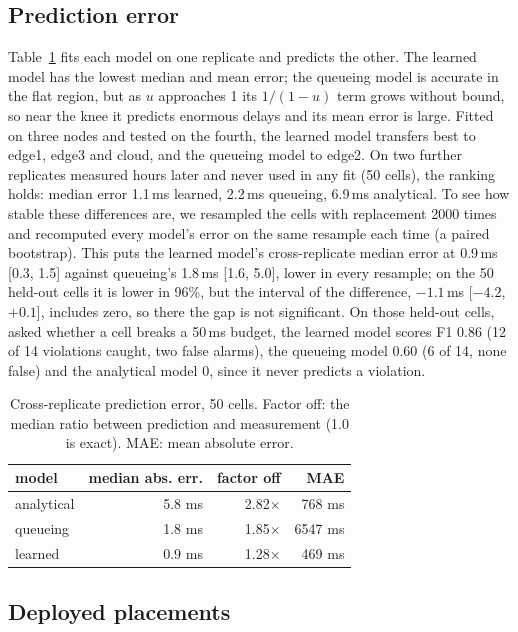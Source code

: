 \documentclass[conference]{IEEEtran}
\begin{document}
\subsection{Prediction error}
Table~\ref{tab:pred} fits each model on one replicate and predicts the other.
The learned model has the lowest median and mean error; the queueing model is
accurate in the flat region, but as $u$ approaches 1 its $1/(1-u)$ term grows
without bound, so near the knee it predicts enormous delays and its mean
error is large. Fitted on three nodes and tested on the fourth, the learned model
transfers best to edge1, edge3 and cloud, and the queueing model to edge2.
On two further replicates measured hours later and never used in any fit
(50 cells), the ranking holds: median error 1.1\,ms learned, 2.2\,ms
queueing, 6.9\,ms analytical. To see how stable these differences are, we resampled
the cells with replacement 2000 times and recomputed every model's error on
the same resample each time (a paired bootstrap). This puts the
learned model's cross-replicate median error at 0.9\,ms [0.3, 1.5] against
queueing's 1.8\,ms [1.6, 5.0], lower in every resample; on the 50 held-out
cells it is lower in 96\%, but the interval of the difference,
$-1.1$\,ms [$-4.2$, $+0.1$], includes zero, so there the gap is not
significant. On those held-out cells, asked whether a cell breaks a 50\,ms
budget, the learned model scores F1 0.86 (12 of 14 violations caught, two
false alarms), the queueing model 0.60 (6 of 14, none false) and the
analytical model 0, since it never predicts a violation.

\begin{table}[t]
\centering
\caption{Cross-replicate prediction error, 50 cells. Factor off: the
median ratio between prediction and measurement (1.0 is exact). MAE: mean
absolute error.}
\label{tab:pred}
\begin{tabular}{lrrr}
\toprule
model & median abs. err. & factor off & MAE \\
\midrule
analytical & 5.8 ms & 2.82$\times$ & 768 ms \\
queueing   & 1.8 ms & 1.85$\times$ & 6547 ms \\
learned    & 0.9 ms & 1.28$\times$ & 469 ms \\
\bottomrule
\end{tabular}
\end{table}

\subsection{Deployed placements}
\end{document}

